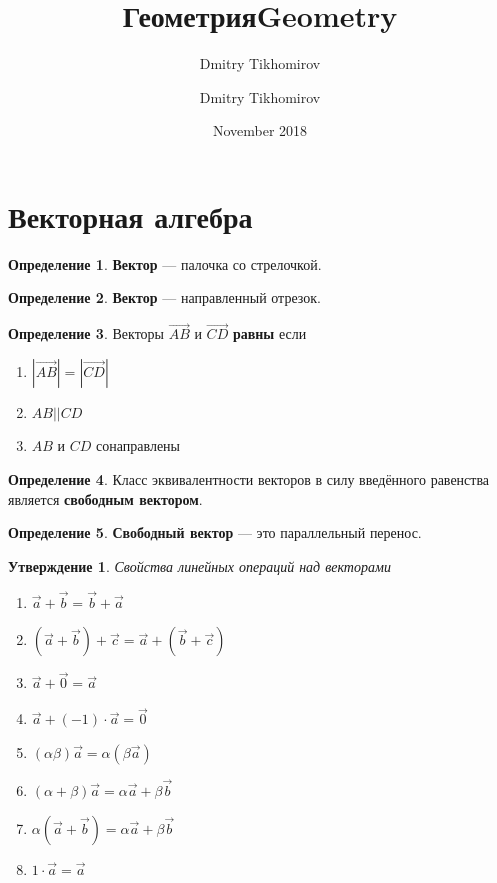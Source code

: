\documentclass{article}
\title{Геометрия}
\author{Dmitry Tikhomirov}
\title{Geometry}
\author{Dmitry Tikhomirov}
\date{November 2018}
\newtheorem{statement}{Утверждение}[section]
\theoremstyle{definition}
\newtheorem{definition}{Определение}
\begin{document}
\maketitle

\tableofcontents
\newpage

\section{Векторная алгебра}

\begin{definition}
\textbf{Вектор} --- палочка со стрелочкой.
\end{definition}

\begin{definition}
\textbf{Вектор} --- направленный отрезок.
\end{definition}

\begin{definition}
Векторы $\overrightarrow{AB}$ и $\overrightarrow{CD}$ \textbf{равны} если
\begin{enumerate}
    \item $|\overrightarrow{AB}| = |\overrightarrow{CD}|$
    \item $AB || CD$
    \item $AB$ и $CD$ сонаправлены
\end{enumerate}
\end{definition}

\begin{definition}
Класс эквивалентности векторов в силу введённого равенства является \textbf{свободным вектором}.
\end{definition}

\begin{definition}
\textbf{Свободный вектор} --- это параллельный перенос.
\end{definition}

\begin{statement}{Свойства линейных операций над векторами}
\begin{enumerate}
    \item $\vec a + \vec b = \vec b + \vec a$
    \item $(\vec a + \vec b) + \vec c = \vec a + (\vec b + \vec c)$
    \item $\vec a + \vec 0 = \vec a$
    \item $\vec a + (-1)\cdot \vec a = \vec 0$
    \item $(\alpha\beta)\vec a = \alpha(\beta\vec a)$
    \item $(\alpha + \beta)\vec a = \alpha\vec a + \beta\vec b$
    \item $\alpha(\vec a + \vec b) = \alpha\vec a + \beta\vec b$
    \item $1\cdot\vec a = \vec a$
\end{enumerate}
\end{statement}
\end{document}

